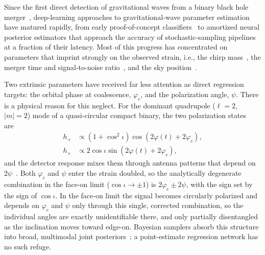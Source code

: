 Since the first direct detection of gravitational waves from a binary black hole merger~\citep{abbott2016gw150914}, deep-learning approaches to gravitational-wave parameter estimation have matured rapidly, from early proof-of-concept classifiers~\citep{george2018deep} to amortized neural posterior estimators that approach the accuracy of stochastic-sampling pipelines~\citep{gabbard2022vitamin,dax2021dingo} at a fraction of their latency.
Most of this progress has concentrated on parameters that imprint strongly on the observed strain, i.e., the chirp mass~\citep{cutler1994gw}, the merger time and signal-to-noise ratio~\citep{allen2012findchirp}, and the sky position~\citep{fairhurst2009triangulation,singer2016bayestar}.

Two extrinsic parameters have received far less attention as direct regression targets: the orbital phase at coalescence, $\varphi_c$, and the polarization angle, $\psi$.
There is a physical reason for this neglect.
For the dominant quadrupole ($\ell=2$, $|m|=2$) mode of a quasi-circular compact binary, the two polarization states are~\citep{sathyaprakash2009physics}
\begin{equation*}
    \begin{aligned}
    h_+ &\propto (1+\cos^2\iota)\cos\left(2\varphi(t)+2\varphi_c\right),\\
    h_\times &\propto 2\cos\iota\sin\left(2\varphi(t)+2\varphi_c\right),
    \end{aligned}
\end{equation*}
and the detector response mixes them through antenna patterns that depend on $2\psi$~\citep{cutler1994gw,sathyaprakash2009physics}.
Both $\varphi_c$ and $\psi$ enter the strain doubled, so the analytically degenerate combination in the face-on limit ($\cos\iota \to \pm 1$) is $2\varphi_c \pm 2\psi$, with the sign set by the sign of $\cos\iota$.
In the face-on limit the signal becomes circularly polarized and depends on $\varphi_c$ and $\psi$ only through this single, corrected combination, so the individual angles are exactly unidentifiable there, and only partially disentangled as the inclination moves toward edge-on.
Bayesian samplers absorb this structure into broad, multimodal joint posteriors~\citep{veitch2010bayesian,aasi2013pe,veitch2015lalinference,ashton2019bilby}; a point-estimate regression network has no such refuge.

